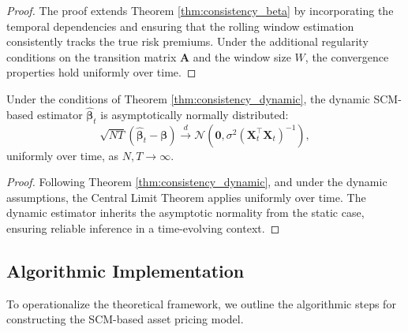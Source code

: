 \begin{proof}
The proof extends Theorem \ref{thm:consistency_beta} by incorporating the temporal dependencies and ensuring that the rolling window estimation consistently tracks the true risk premiums. Under the additional regularity conditions on the transition matrix $\mathbf{A}$ and the window size $W$, the convergence properties hold uniformly over time.
\end{proof}

\begin{corollary}
\label{cor:asymptotic_normality_dynamic}
Under the conditions of Theorem \ref{thm:consistency_dynamic}, the dynamic SCM-based estimator $\hat{\boldsymbol{\beta}}_t$ is asymptotically normally distributed:
\[
\sqrt{NT} (\hat{\boldsymbol{\beta}}_t - \boldsymbol{\beta}) \xrightarrow{d} \mathcal{N}(\mathbf{0}, \sigma^2 (\mathbf{X}_t^\top \mathbf{X}_t)^{-1}),
\]
uniformly over time, as $N, T \rightarrow \infty$.
\end{corollary}

\begin{proof}
Following Theorem \ref{thm:consistency_dynamic}, and under the dynamic assumptions, the Central Limit Theorem applies uniformly over time. The dynamic estimator inherits the asymptotic normality from the static case, ensuring reliable inference in a time-evolving context.
\end{proof}

\subsection{Algorithmic Implementation}

To operationalize the theoretical framework, we outline the algorithmic steps for constructing the SCM-based asset pricing model.

